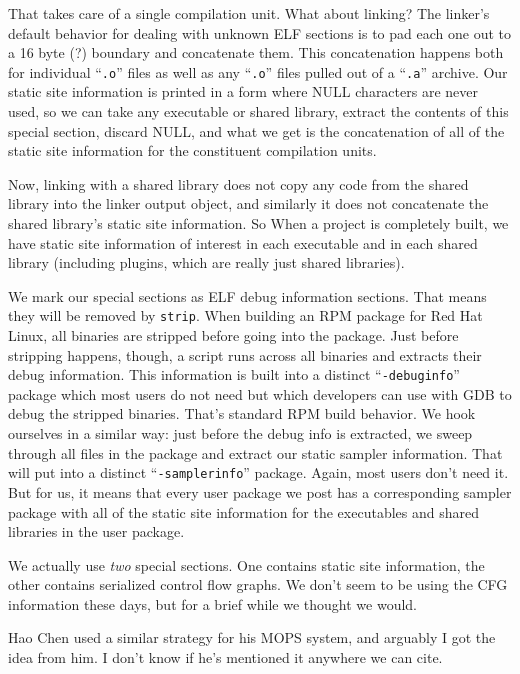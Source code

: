 \documentclass[10pt,twocolumn]{article}
\begin{document}
That takes care of a single compilation unit.  What about linking?
The linker's default behavior for dealing with unknown ELF sections is
to pad each one out to a 16 byte (?) boundary and concatenate them.
This concatenation happens both for individual ``\texttt{.o}'' files
as well as any ``\texttt{.o}'' files pulled out of a ``\texttt{.a}''
archive.  Our static site information is printed in a form where NULL
characters are never used, so we can take any executable or shared
library, extract the contents of this special section, discard NULL,
and what we get is the concatenation of all of the static site
information for the constituent compilation units.

Now, linking with a shared library does not copy any code from the
shared library into the linker output object, and similarly it does
not concatenate the shared library's static site information.  So When
a project is completely built, we have static site information of
interest in each executable and in each shared library (including
plugins, which are really just shared libraries).

We mark our special sections as ELF debug information sections.  That
means they will be removed by \texttt{strip}.  When building an RPM
package for Red Hat Linux, all binaries are stripped before going into
the package.  Just before stripping happens, though, a script runs
across all binaries and extracts their debug information.  This
information is built into a distinct ``\texttt{-debuginfo}'' package
which most users do not need but which developers can use with GDB to
debug the stripped binaries.  That's standard RPM build behavior.  We
hook ourselves in a similar way: just before the debug info is
extracted, we sweep through all files in the package and extract our
static sampler information.  That will put into a distinct
``\texttt{-samplerinfo}'' package.  Again, most users don't need it.
But for us, it means that every user package we post has a
corresponding sampler package with all of the static site information
for the executables and shared libraries in the user package.

We actually use \emph{two} special sections.  One contains static site
information, the other contains serialized control flow graphs.  We
don't seem to be using the CFG information these days, but for a brief
while we thought we would.

Hao Chen used a similar strategy for his MOPS system, and arguably I
got the idea from him.  I don't know if he's mentioned it anywhere we
can cite.
\end{document}
